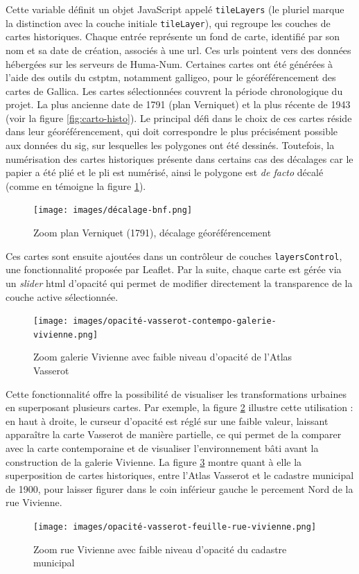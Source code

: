Cette variable définit un objet JavaScript appelé \texttt{tileLayers} (le pluriel marque la distinction avec la couche initiale \texttt{tileLayer}), qui regroupe les couches de cartes historiques. Chaque entrée représente un fond de carte, identifié par son nom et sa date de création, associés à une \acrshort{url}. Ces \acrshort{url}s pointent vers des données hébergées sur les serveurs de Huma-Num. Certaines cartes ont été générées à l'aide des outils du \acrshort{cstptm}, notamment \acrshort{galligeo}, pour le géoréférencement des cartes de Gallica. Les cartes sélectionnées couvrent la période chronologique du projet. La plus ancienne date de 1791 (plan Verniquet) et la plus récente de 1943 (voir la figure \ref{fig:carto-histo}). Le principal défi dans le choix de ces cartes réside dans leur géoréférencement, qui doit correspondre le plus précisément possible aux données du \acrshort{sig}, sur lesquelles les polygones ont été dessinés. Toutefois, la numérisation des cartes historiques présente dans certains cas des décalages car le papier a été plié et le pli est numérisé, ainsi le polygone est \textit{de facto} décalé (comme en témoigne la figure \ref{fig:verniquet-décalage}). 
\begin{figure}[h!]
    \centering
    \texttt{[image: images/décalage-bnf.png]}
    \caption{Zoom plan Verniquet (1791), décalage géoréférencement}
    \label{fig:verniquet-décalage}
\end{figure}
Ces cartes sont ensuite ajoutées dans un contrôleur de couches \texttt{layersControl}, une fonctionnalité proposée par Leaflet. Par la suite, chaque carte est gérée via un \textit{slider} \acrshort{html} d'opacité qui permet de modifier directement la transparence de la couche active sélectionnée.
\begin{figure}[h!]
    \centering
    \texttt{[image: images/opacité-vasserot-contempo-galerie-vivienne.png]}
    \caption{Zoom galerie Vivienne avec faible niveau d'opacité de l'Atlas Vasserot}
    \label{fig:opacité-galerie}
\end{figure}
Cette fonctionnalité offre la possibilité de visualiser les transformations urbaines en superposant plusieurs cartes. Par exemple, la figure \ref{fig:opacité-galerie}  illustre cette utilisation : en haut à droite, le curseur d'opacité est réglé sur une faible valeur, laissant apparaître la carte Vasserot de manière partielle, ce qui permet de la comparer avec la carte contemporaine et de visualiser l'environnement bâti avant la construction de la galerie Vivienne. La figure \ref{fig:opacité-rueVivienne} montre quant à elle la superposition de cartes historiques, entre l'Atlas Vasserot et le cadastre municipal de 1900, pour laisser figurer dans le coin inférieur gauche le percement Nord de la rue Vivienne.
\begin{figure}[h!]
    \centering
    \texttt{[image: images/opacité-vasserot-feuille-rue-vivienne.png]}
    \caption{Zoom rue Vivienne avec faible niveau d'opacité du cadastre municipal}
    \label{fig:opacité-rueVivienne}
\end{figure} 


